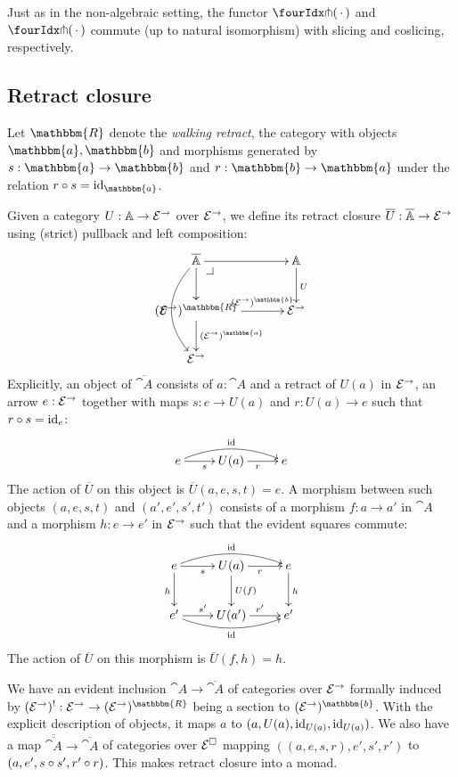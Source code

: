 \documentclass[reqno,10pt,a4paper,oneside]{amsart}
\begin{document}
\begin{remark}
\label{pitchfork-slicing}
Just as in the non-algebraic setting, the functor $\liftr{\brarghole}$ and $\liftl{\brarghole}$ commute (up to natural isomorphism) with slicing and coslicing, respectively.
\end{remark}

\subsection{Retract closure}

\newcommand{\ret}{\mathbbm{R}}
\newcommand{\retA}{\mathbbm{a}}
\newcommand{\retB}{\mathbbm{b}}

Let $\ret$ denote the \emph{walking retract}, \ie the category with objects $\retA, \retB$ and morphisms generated by $s : \retA \to \retB$ and $r : \retB \to \retA$ under the relation $r \cc s = \id_{\retA}$.

Given a category $U : \mathbb{A} \to \mathcal{E}^{\to}$ over $\mathcal{E}^{\to}$, we define its retract closure $\overline{U} : \overline{\mathbb{A}} \to \mathcal{E}^{\to}$ using (strict) pullback and left composition:
\[
\xymatrix@C+1em{
  \overline{\cat{A}}
  \ar[r]
  \ar[d]
  \ar@/_2em/[dd]_{\overline{U}}
  \pullback{dr}
&
  \cat{A}
  \ar[d]^{U}
\\
  (\catE^{\to})^{\ret}
  \ar[r]^-{(\catE^{\to})^{\retB}}
  \ar[d]^{(\catE^{\to})^{\retA}}
&
  \catE^{\to}
\\
  \catE^{\to}
}
\]
Explicitly, an object of $\overline{\cat{A}}$ consists of $a : \cat{A}$ and a retract of $U(a)$ in $\mathcal{E}^{\to}$, \ie an arrow $e : \mathcal{E}^{\to}$ together with maps $s : e \to U(a)$ and $r : U(a) \to e$ such that $r \mathbin{\circ} s = \operatorname{id}_e$:
\[
\xymatrix{
  e
  \ar[r]_{s}
  \ar@/^1em/[rr]^{\id}
&
  U(a)
  \ar[r]_{r}
&
  e
}
\]
The action of $\overline{U}$ on this object is $\overline{U}(a, e, s, t) = e$.
A morphism between such objects $(a, e, s, t)$ and $(a', e', s', t')$ consists of a morphism $f : a \to a'$ in $\cat{A}$ and a morphism $h : e \to e'$ in $\mathcal{E}^{\to}$ such that the evident squares commute:
\[
\xymatrix{
  e
  \ar[r]_{s}
  \ar@/^1em/[rr]^{\id}
  \ar[d]_{h}
&
  U(a)
  \ar[r]_{r}
  \ar[d]^{U(f)}
&
  e
  \ar[d]^{h}
\\
  e'
  \ar[r]^{s'}
  \ar@/_1em/[rr]_{\id}
&
  U(a')
  \ar[r]^{r'}
&
  e'
}
\]
The action of $\overline{U}$ on this morphism is $\overline{U}(f, h) = h$.

We have an evident inclusion $\cat{A} \to \overline{\cat{A}}$ of categories over $\mathcal{E}^{\to}$ formally induced by $(\catE^{\to})^{\canonical} : \catE^{\to} \to (\catE^{\to})^{\ret}$ being a section to $(\catE^{\to})^{\retB}$.
With the explicit description of objects, it maps $a$ to $(a, U(a), \operatorname{id}_{U(a)}, \operatorname{id}_{U(a)})$.
We also have a map $\overline{\overline{\cat{A}}} \to \overline{\cat{A}}$ of categories over $\mathcal{E}^{\Box}$ mapping $((a, e, s, r), e', s', r')$ to $(a, e', s \mathbin{\circ} s', r' \mathbin{\circ} r)$.
This makes retract closure into a monad.
\end{document}
